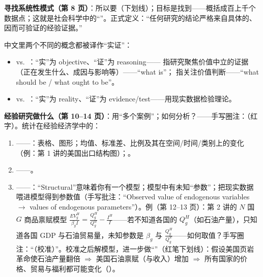\textbf{寻找系统性模式（第 8 页）}：所以要（下划线）；目标是找到——概括成百上千个数据点；这就是社会科学中的``''。正式定义：``任何研究的结论严格来自具体的、因而可验证的经验证据。''

\begin{intubox}
中文里两个不同的概念都被译作``实证''：
\begin{itemize}
  \item {} vs.\ ：``实''为 objective、``证''为 reasoning—— 指研究聚焦价值中立的证据（正在发生什么、成因与影响等）——``what is''； 指关注价值判断——``what should be / what ought to be''。
  \item {} vs.\ ：``实''为 reality、``证''为 evidence/test——用现实数据检验理论。
\end{itemize}
\end{intubox}

\textbf{经验研究做什么（第 10--14 页）}：用``多个案例''；如何分析？——手写圈注：（红字）。统计在经验经济学中的：
\begin{enumerate}
  \item {}——：表格、图形；均值、标准差、比例及其在空间/时间/类别上的变化（例：第 1 讲的美国出口结构图）；。
  \item {}——。
  \item {}——：``Structural''意味着你有一个模型；模型中有未知``参数''；把现实数据喂进模型得到参数值（手写批注：``Observed value of endogenous variables $\to$ values of endogenous parameters''）。例（第 12--13 页）：第 2 讲的 $N$ 国 $G$ 商品禀赋模型 $\frac{EV_g^H}{\beta_g I} = \frac{Q_g^H}{Q_g^w} - \frac{I^H}{I}$——若不知道各国的 $Q_g^H$（如石油产量），只知道各国 GDP 与石油贸易量，未知参数是 $\beta_g$ 与 $\frac{Q_g^H}{Q_g^w}$——如何取值？手写圈注：``（校准）''。校准之后解模型，进一步做``''（红笔下划线）：假设美国页岩革命使石油产量翻倍 $\Rightarrow$ 美国石油禀赋（与收入）增加 $\Rightarrow$ 所有国家的价格、贸易与福利都可能变化（）。
\end{enumerate}

